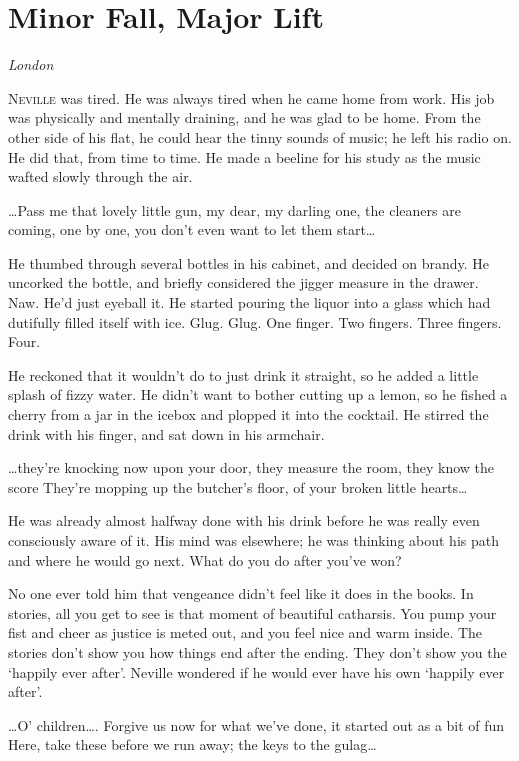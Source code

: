 \chapter{Minor Fall, Major Lift}

\textit{London}

\lettrine{N}{eville} was tired. He was always tired when he came home from work. His job was physically and mentally draining, and he was glad to be home. From the other side of his flat, he could hear the tinny sounds of music; he left his radio on. He did that, from time to time. He made a beeline for his study as the music wafted slowly through the air.

…Pass me that lovely little gun, my dear, my darling one,
the cleaners are coming, one by one, you don’t even want to let them start…

He thumbed through several bottles in his cabinet, and decided on brandy. He uncorked the bottle, and briefly considered the jigger measure in the drawer. Naw. He’d just eyeball it. He started pouring the liquor into a glass which had dutifully filled itself with ice. Glug. Glug. One finger. Two fingers. Three fingers. Four.

He reckoned that it wouldn’t do to just drink it straight, so he added a little splash of fizzy water. He didn’t want to bother cutting up a lemon, so he fished a cherry from a jar in the icebox and plopped it into the cocktail. He stirred the drink with his finger, and sat down in his armchair.

…they’re knocking now upon your door, they measure the room, they know the score
They’re mopping up the butcher’s floor, of your broken little hearts…

He was already almost halfway done with his drink before he was really even consciously aware of it. His mind was elsewhere; he was thinking about his path and where he would go next. What do you do after you’ve won?

No one ever told him that vengeance didn’t feel like it does in the books. In stories, all you get to see is that moment of beautiful catharsis. You pump your fist and cheer as justice is meted out, and you feel nice and warm inside. The stories don’t show you how things end after the ending. They don’t show you the ‘happily ever after’. Neville wondered if he would ever have his own ‘happily ever after’.

…O’ children…. Forgive us now for what we’ve done, it started out as a bit of fun
Here, take these before we run away; the keys to the gulag…

